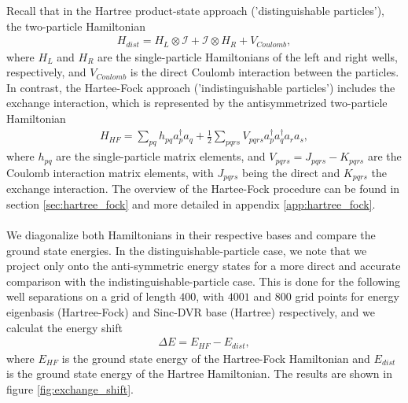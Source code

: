 \documentclass{subfiles}
\begin{document}
Recall that in the Hartree product-state approach ('distinguishable particles'), the two-particle Hamiltonian
\begin{align*}
    H_{dist} = H_L \otimes \mathcal{I} + \mathcal{I} \otimes H_R + V_{Coulomb},
\end{align*}
where $H_L$ and $H_R$ are the single-particle Hamiltonians of the left and right wells, respectively, and $V_{Coulomb}$ is the direct Coulomb interaction between the particles. In contrast, the Hartee-Fock approach ('indistinguishable particles') includes the exchange interaction, which is represented by the antisymmetrized two-particle Hamiltonian
\begin{align*}
    H_{HF} = \sum_{pq} h_{pq} a_p^\dagger a_q + \frac{1}{2} \sum_{pqrs} V_{pqrs} a_p^\dagger a_q^\dagger a_r a_s,
\end{align*}
where $h_{pq}$ are the single-particle matrix elements, and $V_{pqrs} = J_{pqrs} - K_{pqrs}$ are the Coulomb interaction matrix elements, with $J_{pqrs}$ being the direct and $K_{pqrs}$ the exchange interaction. The overview of the Hartee-Fock procedure can be found in section \ref{sec:hartree_fock} and more detailed in appendix \ref{app:hartree_fock}. \\\\
We diagonalize both Hamiltonians in their respective bases and compare the ground state energies. In the distinguishable-particle case, we note that we project only onto the anti-symmetric energy states for a more direct and accurate comparison with the indistinguishable-particle case. This is done for the following well separations on a grid of length $400$, with $4001$ and $800$ grid points for energy eigenbasis (Hartree-Fock) and Sinc-DVR base (Hartree) respectively, and we calculat the energy shift
\begin{align*}
    \Delta E = E_{HF} - E_{dist},
\end{align*}
where $E_{HF}$ is the ground state energy of the Hartree-Fock Hamiltonian and $E_{dist}$ is the ground state energy of the Hartree Hamiltonian. The results are shown in figure \ref{fig:exchange_shift}. 
\end{document}
